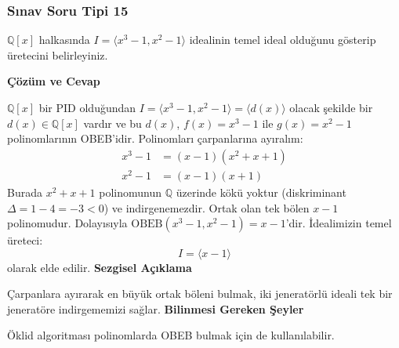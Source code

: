 \documentclass[11pt, a4paper]{article}
\newenvironment{cozum}{
    \vspace{0.5cm}
    \noindent\textcolor{green!60!black}{\faCheckCircle\enspace \textbf{\Large Çözüm ve Cevap}}\par\vspace{0.2cm}
}{}
\newenvironment{sezgisel}{
    \vspace{0.5cm}
    \noindent\textcolor{orange!80!black}{\faLightbulb\enspace \textbf{\Large Sezgisel Açıklama}}\par\vspace{0.2cm}
    \itshape
}{}
\newenvironment{bilgi}{
    \vspace{0.5cm}
    \noindent\textcolor{red!70!black}{\faExclamationTriangle\enspace \textbf{\Large Bilinmesi Gereken Şeyler}}\par\vspace{0.2cm}
}{}
\begin{document}
\subsubsection{Sınav Soru Tipi 15}
\begin{sinavbox}
$\mathbb{Q}[x]$ halkasında $I = \langle x^3-1, x^2-1 \rangle$ idealinin temel ideal olduğunu gösterip üretecini belirleyiniz.
\end{sinavbox}
\begin{cozum}
$\mathbb{Q}[x]$ bir PID olduğundan $I = \langle x^3-1, x^2-1 \rangle = \langle d(x) \rangle$ olacak şekilde bir $d(x) \in \mathbb{Q}[x]$ vardır ve bu $d(x)$, $f(x)=x^3-1$ ile $g(x)=x^2-1$ polinomlarının OBEB'idir.
Polinomları çarpanlarına ayıralım:
\begin{align*}
x^3-1 &= (x-1)(x^2+x+1) \\
x^2-1 &= (x-1)(x+1)
\end{align*}
Burada $x^2+x+1$ polinomunun $\mathbb{Q}$ üzerinde kökü yoktur (diskriminant $\Delta = 1-4 = -3 < 0$) ve indirgenemezdir.
Ortak olan tek bölen $x-1$ polinomudur.
Dolayısıyla $\text{OBEB}(x^3-1, x^2-1) = x-1$'dir.
İdealimizin temel üreteci:
\[ I = \langle x-1 \rangle \]
olarak elde edilir.
\end{cozum}
\begin{sezgisel}
Çarpanlara ayırarak en büyük ortak böleni bulmak, iki jeneratörlü ideali tek bir jeneratöre indirgememizi sağlar.
\end{sezgisel}
\begin{bilgi}
Öklid algoritması polinomlarda OBEB bulmak için de kullanılabilir.
\end{bilgi}
\end{document}
